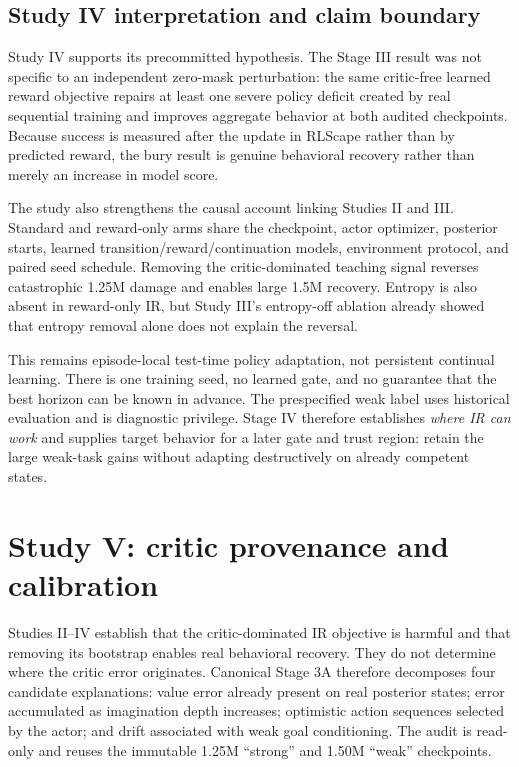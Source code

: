 \documentclass[10pt]{article}
\begin{document}
\subsection{Study IV interpretation and claim boundary}

Study IV supports its precommitted hypothesis. The Stage III result was not specific to an independent zero-mask perturbation: the same critic-free learned reward objective repairs at least one severe policy deficit created by real sequential training and improves aggregate behavior at both audited checkpoints. Because success is measured after the update in RLScape rather than by predicted reward, the bury result is genuine behavioral recovery rather than merely an increase in model score.

The study also strengthens the causal account linking Studies II and III. Standard and reward-only arms share the checkpoint, actor optimizer, posterior starts, learned transition/reward/continuation models, environment protocol, and paired seed schedule. Removing the critic-dominated teaching signal reverses catastrophic 1.25M damage and enables large 1.5M recovery. Entropy is also absent in reward-only IR, but Study III's entropy-off ablation already showed that entropy removal alone does not explain the reversal.

This remains episode-local test-time policy adaptation, not persistent continual learning. There is one training seed, no learned gate, and no guarantee that the best horizon can be known in advance. The prespecified weak label uses historical evaluation and is diagnostic privilege. Stage IV therefore establishes \emph{where IR can work} and supplies target behavior for a later gate and trust region: retain the large weak-task gains without adapting destructively on already competent states.

\section{Study V: critic provenance and calibration}

Studies II--IV establish that the critic-dominated IR objective is harmful and that removing its bootstrap enables real behavioral recovery. They do not determine where the critic error originates. Canonical Stage 3A therefore decomposes four candidate explanations: value error already present on real posterior states; error accumulated as imagination depth increases; optimistic action sequences selected by the actor; and drift associated with weak goal conditioning. The audit is read-only and reuses the immutable 1.25M ``strong'' and 1.50M ``weak'' checkpoints.
\end{document}
